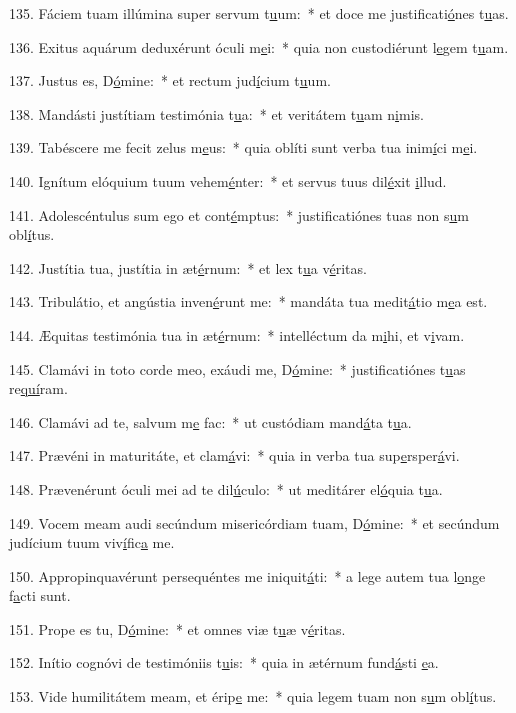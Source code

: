 135. Fáciem tuam illúmina super servum t\uline{u}um:~* et doce me justificati\uline{ó}nes t\uline{u}as.\par 
136. Exitus aquárum deduxérunt óculi m\uline{e}i:~* quia non custodiérunt l\uline{e}gem t\uline{u}am.\par 
137. Justus es, D\uline{ó}mine:~* et rectum jud\uline{í}cium t\uline{u}um.\par 
138. Mandásti justítiam testimónia t\uline{u}a:~* et veritátem t\uline{u}am n\uline{i}mis.\par 
139. Tabéscere me fecit zelus m\uline{e}us:~* quia oblíti sunt verba tua inim\uline{í}ci m\uline{e}i.\par 
140. Ignítum elóquium tuum vehem\uline{é}nter:~* et servus tuus dil\uline{é}xit \uline{i}llud.\par 
141. Adolescéntulus sum ego et cont\uline{é}mptus:~* justificatiónes tuas non s\uline{u}m obl\uline{í}tus.\par 
142. Justítia tua, justítia in æt\uline{é}rnum:~* et lex t\uline{u}a v\uline{é}ritas.\par 
143. Tribulátio, et angústia inven\uline{é}runt me:~* mandáta tua medit\uline{á}tio m\uline{e}a est.\par 
144. Æquitas testimónia tua in æt\uline{é}rnum:~* intelléctum da m\uline{i}hi, et v\uline{i}vam.\par 
145. Clamávi in toto corde meo, exáudi me, D\uline{ó}mine:~* justificatiónes t\uline{u}as re\uline{quí}ram.\par 
146. Clamávi ad te, salvum m\uline{e} fac:~* ut custódiam mand\uline{á}ta t\uline{u}a.\par 
147. Prævéni in maturitáte, et clam\uline{á}vi:~* quia in verba tua sup\uline{e}rsper\uline{á}vi.\par 
148. Prævenérunt óculi mei ad te dil\uline{ú}culo:~* ut meditárer el\uline{ó}quia t\uline{u}a.\par 
149. Vocem meam audi secúndum misericórdiam tuam, D\uline{ó}mine:~* et secúndum judícium tuum viv\uline{í}fic\uline{a} me.\par 
150. Appropinquavérunt persequéntes me iniquit\uline{á}ti:~* a lege autem tua l\uline{o}nge f\uline{a}cti sunt.\par 
151. Prope es tu, D\uline{ó}mine:~* et omnes viæ t\uline{u}æ v\uline{é}ritas.\par 
152. Inítio cognóvi de testimóniis t\uline{u}is:~* quia in ætérnum fund\uline{á}sti \uline{e}a.\par 
153. Vide humilitátem meam, et érip\uline{e} me:~* quia legem tuam non s\uline{u}m obl\uline{í}tus.\par 
